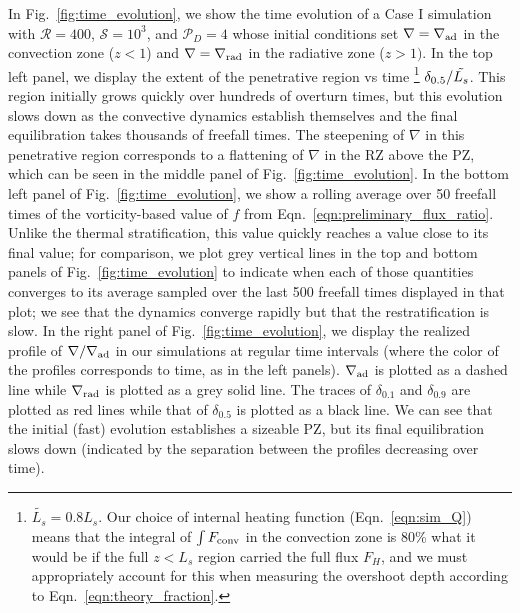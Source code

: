 \documentclass{aastex631}
\newcommand{\gradrad}{\ensuremath{\nabla_{\rm{rad}}}}
\newcommand{\gradad}{\ensuremath{\nabla_{\rm{ad}}}}
\newcommand{\justgrad}{\ensuremath{\nabla}}
\newcommand{\Fconv}{\ensuremath{F_{\rm{conv}}}}
\newcommand{\mP}{\ensuremath{\mathcal{P}}}
\newcommand{\mR}{\ensuremath{\mathcal{R}}}
\newcommand{\mS}{\ensuremath{\mathcal{S}}}
\begin{document}
In Fig.~\ref{fig:time_evolution}, we show the time evolution of a Case I simulation with $\mR = 400$, $\mS = 10^3$, and $\mP_D = 4$ whose initial conditions set $\justgrad = \gradad$ in the convection zone ($z < 1$) and $\justgrad = \gradrad$ in the radiative zone ($z > 1)$.
In the top left panel, we display the extent of the penetrative region vs time \footnote{$\tilde{L_s} = 0.8L_s$. Our choice of internal heating function (Eqn.~\ref{eqn:sim_Q}) means that the integral of $\int\Fconv$ in the convection zone is 80\% what it would be if the full $z < L_s$ region carried the full flux $F_H$, and we must appropriately account for this when measuring the overshoot depth according to Eqn.~\ref{eqn:theory_fraction}.} $\delta_{\rm{0.5}}/\tilde{L_s}$.
This region initially grows quickly over hundreds of overturn times, but this evolution slows down as the convective dynamics establish themselves and the final equilibration takes thousands of freefall times.
The steepening of $\justgrad$ in this penetrative region corresponds to a flattening of $\justgrad$ in the RZ above the PZ, which can be seen in the middle panel of Fig.~\ref{fig:time_evolution}.
In the bottom left panel of Fig.~\ref{fig:time_evolution}, we show a rolling average over 50 freefall times of the vorticity-based value of $f$ from Eqn.~\ref{eqn:preliminary_flux_ratio}.
Unlike the thermal stratification, this value quickly reaches a value close to its final value; for comparison, we plot grey vertical lines in the top and bottom panels of Fig.~\ref{fig:time_evolution} to indicate when each of those quantities converges to its average sampled over the last 500 freefall times displayed in that plot; we see that the dynamics converge rapidly but that the restratification is slow.
In the right panel of Fig.~\ref{fig:time_evolution}, we display the realized profile of $\justgrad/\gradad$ in our simulations at regular time intervals (where the color of the profiles corresponds to time, as in the left panels).
$\gradad$ is plotted as a dashed line while $\gradrad$ is plotted as a grey solid line.
The traces of $\delta_{0.1}$ and $\delta_{0.9}$ are plotted as red lines while that of $\delta_{0.5}$ is plotted as a black line.
We can see that the initial (fast) evolution establishes a sizeable PZ, but its final equilibration slows down (indicated by the separation between the profiles decreasing over time).
\end{document}
